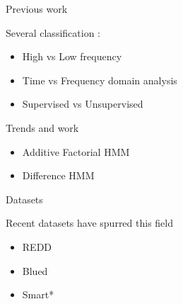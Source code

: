 \documentclass[conference]{IEEEtran}
\begin{document}
Previous work

Several classification \cite{survey1,survey2,survey3}:
\begin{itemize}
\item High vs Low frequency
\item Time vs Frequency domain analysis
\item Supervised vs Unsupervised
\end{itemize}

Trends and work
\begin{itemize}
\item Additive Factorial HMM
\item Difference HMM \cite{parson2012_aaai}
\end{itemize}

Datasets

Recent datasets have spurred this field
\begin{itemize}
\item REDD \cite{redd}
\item Blued \cite{blued_cmu}
\item Smart* \cite{smart}
\end{itemize}

%
%

\end{document}
